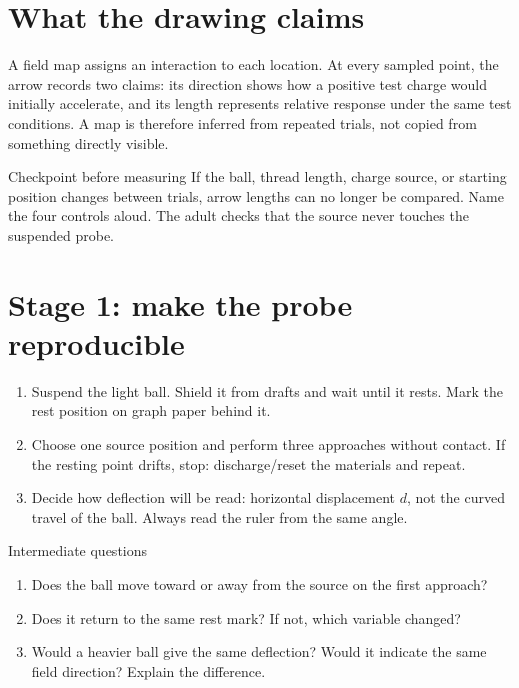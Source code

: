 \fieldapparatus

\section{What the drawing claims}
A field map assigns an interaction to each location. At every sampled point,
the arrow records two claims: its direction shows how a positive test charge
would initially accelerate, and its length represents relative response under
the same test conditions. A map is therefore inferred from repeated trials,
not copied from something directly visible.

\begin{telospanel}{Checkpoint before measuring}
If the ball, thread length, charge source, or starting position changes between
trials, arrow lengths can no longer be compared. Name the four controls aloud.
The adult checks that the source never touches the suspended probe.
\end{telospanel}

\newpage
{}
\small
\section{Stage 1: make the probe reproducible}
\begin{enumerate}
\item Suspend the light ball. Shield it from drafts and wait until it rests.
Mark the rest position on graph paper behind it.
\item Choose one source position and perform three approaches without contact.
If the resting point drifts, stop: discharge/reset the materials and repeat.
\item Decide how deflection will be read: horizontal displacement \(d\), not
the curved travel of the ball. Always read the ruler from the same angle.
\end{enumerate}

\begin{teloscard}{Intermediate questions}
\begin{enumerate}
\item Does the ball move toward or away from the source on the first approach?
\item Does it return to the same rest mark? If not, which variable changed?
\item Would a heavier ball give the same deflection? Would it indicate the same
field direction? Explain the difference.
\end{enumerate}
\end{teloscard}

